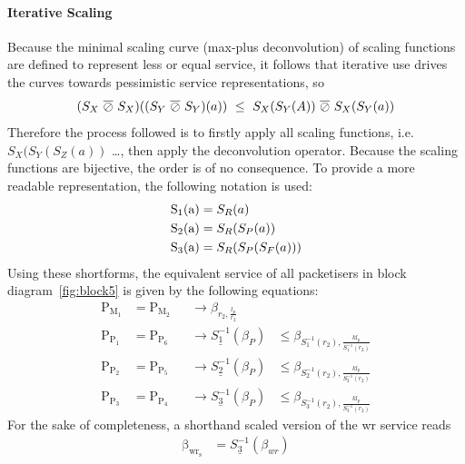 \paragraph{Iterative Scaling}
Because the minimal scaling curve (max-plus deconvolution) of scaling functions are defined to represent less or equal service, it follows that iterative use drives the curves towards pessimistic service representations, so 
\begin{equation}
\notag
(S_X \phantom{~}\overline{\oslash}\phantom{~} S_X) ((S_Y \phantom{~}\overline{\oslash}\phantom{~} S_Y)(a)) \phantom{~}  \le \phantom{~} S_X(S_Y(A)) \phantom{~}\overline{\oslash}\phantom{~} S_X(S_Y(a))
\end{equation}
Therefore the process followed is to firstly apply all scaling functions, i.e. $S_X(S_Y(S_Z(a))$ \dots, then apply the deconvolution operator. Because the scaling functions are bijective, the order is of no consequence.
To provide a more readable representation, the following notation is used:
%
\begin{equation}
\begin{aligned}
\notag
\mathrm{ S_1(a)} &= S_R(a)\\
\mathrm{ S_2(a)} &= S_R(S_P(a))\\
\mathrm{ S_3(a)} &= S_R(S_P(S_F(a)))
\label{eq:scaling-shorthand}
\end{aligned}
\end{equation}
%
Using these shortforms, the equivalent service of all packetisers in block diagram~\ref{fig:block5} is given by the following equations:
\begin{align}
\mathrm{P_{M_1}} &=  \mathrm{P_{M_2}} &&\to \beta_{r_2, \frac{l_p}{r_2}}&\phantom{~}\\[6pt]
\mathrm{P_{P_1}} &=  \mathrm{P_{P_6}} &&\to \underline{S^{-1}_1} \left ( \beta_{P} \right) &\le \beta_{S^{-1}_1(r_2), \frac{kl_p}{S^{-1}_1(r_2)}}\\[6pt]
\mathrm{P_{P_2}} &=  \mathrm{P_{P_5}} &&\to \underline{S^{-1}_2} \left ( \beta_{P} \right) &\le \beta_{S^{-1}_2(r_2), \frac{kl_p}{S^{-1}_2(r_2)}}\\[6pt]
\mathrm{P_{P_3}} &=  \mathrm{P_{P_4}} &&\to \underline{S^{-1}_3} \left ( \beta_{P} \right) &\le \beta_{S^{-1}_3(r_2), \frac{kl_p}{S^{-1}_3(r_2)}}
\label{eq:pack_serv}
\end{align}
%
For the sake of completeness, a shorthand scaled version of the \gls{wr} service reads
\begin{align}
\mathrm{\beta_{wr_s}} &=  \underline{S^{-1}_3} \left ( \beta_{wr} \right)
\label{eq:wr-serv-concat}
\end{align}

